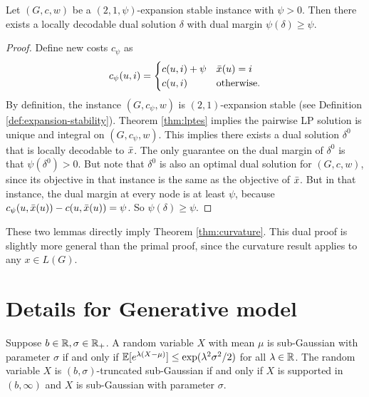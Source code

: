 \begin{lemma}
Let $(G,c,w)$ be a $(2,1,\psi)$-expansion stable instance with $\psi > 0$. Then there exists a locally decodable dual solution $\delta$ with dual margin $\psi(\delta) \ge \psi$.
\end{lemma}
\begin{proof}
Define new costs $c_{\psi}$ as
\[
c_\psi(u,i) = \begin{cases}
c(u,i) + \psi & \bar{x}(u) = i\\
c(u,i) & \text{otherwise.}
\end{cases}
\]
By definition, the instance $(G,c_{\psi},w)$ is $(2,1)$-expansion stable (see Definition \ref{def:expansion-stability}). Theorem \ref{thm:lptes} implies the pairwise LP solution is unique and integral on $(G,c_{\psi},w)$. This implies there exists a dual solution $\delta^0$ that is locally decodable to $\bar{x}$. The only guarantee on the dual margin of $\delta^0$ is that $\psi(\delta^0) > 0$. But note that $\delta^0$ is also an optimal dual solution for $(G,c,w)$, since its objective in that instance is the same as the objective of $\bar{x}$. But in that instance, the dual margin at every node is at least $\psi$, because $c_{\psi}(u,\bar{x}(u)) - c(u,\bar{x}(u)) = \psi$. So $\psi(\delta) \ge \psi$.
\end{proof}

These two lemmas directly imply Theorem \ref{thm:curvature}. This dual proof is slightly more general than the primal proof, since the curvature result applies to any $x\in L(G)$.




\section{Details for Generative model}\label{sec:random-model_details}

\begin{definition} \label{def:subG}
Suppose $b \in \mathbb{R}, \sigma \in \mathbb{R}_+$.
A random variable $X$ with mean $\mu$ is sub-Gaussian with parameter $\sigma$ if and only if  $\operatorname*{\mathbb{E}}[e^{\lambda(X-\mu)}]\le \exp(\lambda^2 \sigma^2/2)$ for all $\lambda \in \mathbb{R}$.
The random variable $X$ is $(b,\sigma)$-truncated sub-Gaussian if and only if $X$ is supported in $(b,\infty)$ and $X$ is sub-Gaussian with parameter $\sigma$. 
\end{definition}

